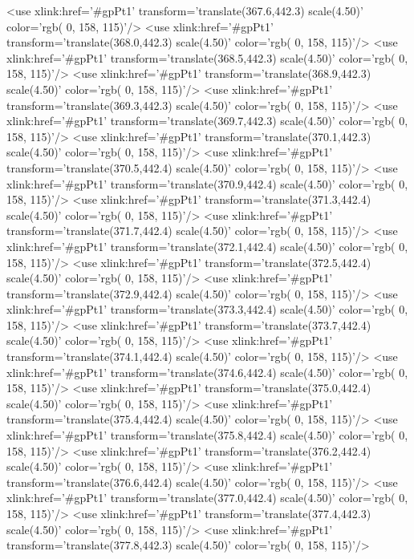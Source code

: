 	<use xlink:href='#gpPt1' transform='translate(367.6,442.3) scale(4.50)' color='rgb(  0, 158, 115)'/>
	<use xlink:href='#gpPt1' transform='translate(368.0,442.3) scale(4.50)' color='rgb(  0, 158, 115)'/>
	<use xlink:href='#gpPt1' transform='translate(368.5,442.3) scale(4.50)' color='rgb(  0, 158, 115)'/>
	<use xlink:href='#gpPt1' transform='translate(368.9,442.3) scale(4.50)' color='rgb(  0, 158, 115)'/>
	<use xlink:href='#gpPt1' transform='translate(369.3,442.3) scale(4.50)' color='rgb(  0, 158, 115)'/>
	<use xlink:href='#gpPt1' transform='translate(369.7,442.3) scale(4.50)' color='rgb(  0, 158, 115)'/>
	<use xlink:href='#gpPt1' transform='translate(370.1,442.3) scale(4.50)' color='rgb(  0, 158, 115)'/>
	<use xlink:href='#gpPt1' transform='translate(370.5,442.4) scale(4.50)' color='rgb(  0, 158, 115)'/>
	<use xlink:href='#gpPt1' transform='translate(370.9,442.4) scale(4.50)' color='rgb(  0, 158, 115)'/>
	<use xlink:href='#gpPt1' transform='translate(371.3,442.4) scale(4.50)' color='rgb(  0, 158, 115)'/>
	<use xlink:href='#gpPt1' transform='translate(371.7,442.4) scale(4.50)' color='rgb(  0, 158, 115)'/>
	<use xlink:href='#gpPt1' transform='translate(372.1,442.4) scale(4.50)' color='rgb(  0, 158, 115)'/>
	<use xlink:href='#gpPt1' transform='translate(372.5,442.4) scale(4.50)' color='rgb(  0, 158, 115)'/>
	<use xlink:href='#gpPt1' transform='translate(372.9,442.4) scale(4.50)' color='rgb(  0, 158, 115)'/>
	<use xlink:href='#gpPt1' transform='translate(373.3,442.4) scale(4.50)' color='rgb(  0, 158, 115)'/>
	<use xlink:href='#gpPt1' transform='translate(373.7,442.4) scale(4.50)' color='rgb(  0, 158, 115)'/>
	<use xlink:href='#gpPt1' transform='translate(374.1,442.4) scale(4.50)' color='rgb(  0, 158, 115)'/>
	<use xlink:href='#gpPt1' transform='translate(374.6,442.4) scale(4.50)' color='rgb(  0, 158, 115)'/>
	<use xlink:href='#gpPt1' transform='translate(375.0,442.4) scale(4.50)' color='rgb(  0, 158, 115)'/>
	<use xlink:href='#gpPt1' transform='translate(375.4,442.4) scale(4.50)' color='rgb(  0, 158, 115)'/>
	<use xlink:href='#gpPt1' transform='translate(375.8,442.4) scale(4.50)' color='rgb(  0, 158, 115)'/>
	<use xlink:href='#gpPt1' transform='translate(376.2,442.4) scale(4.50)' color='rgb(  0, 158, 115)'/>
	<use xlink:href='#gpPt1' transform='translate(376.6,442.4) scale(4.50)' color='rgb(  0, 158, 115)'/>
	<use xlink:href='#gpPt1' transform='translate(377.0,442.4) scale(4.50)' color='rgb(  0, 158, 115)'/>
	<use xlink:href='#gpPt1' transform='translate(377.4,442.3) scale(4.50)' color='rgb(  0, 158, 115)'/>
	<use xlink:href='#gpPt1' transform='translate(377.8,442.3) scale(4.50)' color='rgb(  0, 158, 115)'/>
